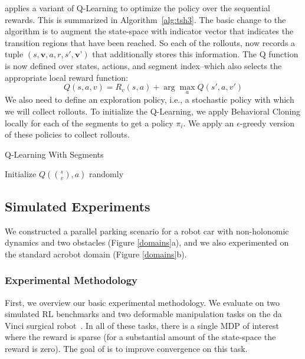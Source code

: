 \hirl applies a variant of Q-Learning to optimize the policy over the sequential rewards. This is summarized in Algorithm~\ref{alg:tsh3}. The basic change to the algorithm is to augment the state-space with indicator vector that indicates the transition regions that have been reached. So each of the rollouts, now records a tuple $(s,\textbf{v},a,r, s', \textbf{v'})$ that additionally stores this information. The Q function is now defined over states, actions, and segment index--which also selects the appropriate local reward function:
\[
Q(s,a,v) = R_v(s,a) + \arg \max_{a} Q(s',a, v')
\]
We also need to define an exploration policy, i.e., a stochastic policy with which we will collect rollouts. To initialize the Q-Learning, we apply Behavioral Cloning locally for each of the segments to get a policy $\pi_i$. We apply an $\epsilon$-greedy version of these policies to collect rollouts.

\begin{algorithmic}[t]
\small
\caption{Q-Learning With Segments \label{alg:tsh3}}

Initialize $Q(\binom{s}{v},a)$ randomly


\end{algorithmic}

\subsection{Simulated Experiments}
We constructed a parallel parking scenario for a robot car with non-holonomic dynamics and two obstacles (Figure \ref{domains}a), and we also experimented on the standard acrobot domain (Figure \ref{domains}b).

\subsubsection{Experimental Methodology}
First, we overview our basic experimental methodology. We evaluate \hirl on two simulated RL benchmarks and two deformable manipulation tasks on the da Vinci surgical robot~\cite{kazanzides2014open}. In all of these tasks, there is a single MDP of interest where the  reward is sparse (for a substantial amount of the state-space the reward is zero). The goal of \hirl is to improve convergence on this task.

